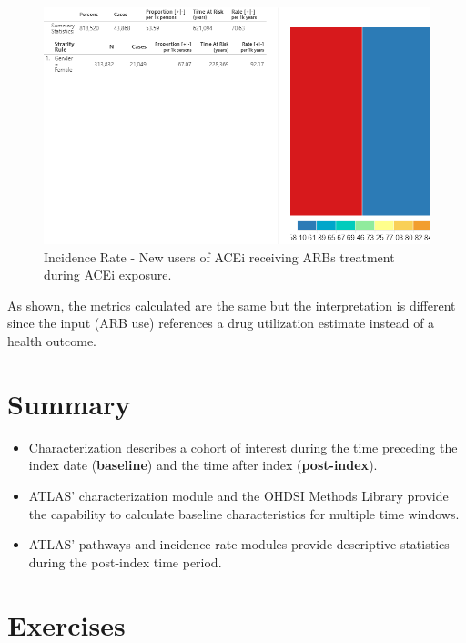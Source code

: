 \documentclass[11pt]{book}
\theoremstyle{definition}
\theoremstyle{definition}
\theoremstyle{definition}
\theoremstyle{remark}
\let\BeginKnitrBlock\begin \let\EndKnitrBlock\end
\begin{document}
\begin{figure}

{\centering \includegraphics[width=1\linewidth]{images/Characterization/atlasIncidenceResultsARB} 

}

\caption{Incidence Rate - New users of ACEi receiving ARBs treatment during ACEi exposure.}\label{fig:atlasIncidenceResultsARB}
\end{figure}

As shown, the metrics calculated are the same but the interpretation is different since the input (ARB use) references a drug utilization estimate instead of a health outcome.

\hypertarget{summary-8}{%
\section{Summary}\label{summary-8}}

\BeginKnitrBlock{rmdsummary}
\begin{itemize}
\item
  Characterization describes a cohort of interest during the time preceding the index date (\textbf{baseline}) and the time after index (\textbf{post-index}).
\item
  ATLAS' characterization module and the OHDSI Methods Library provide the capability to calculate baseline characteristics for multiple time windows.
\item
  ATLAS' pathways and incidence rate modules provide descriptive statistics during the post-index time period.
\end{itemize}
\EndKnitrBlock{rmdsummary}

\hypertarget{exercises-3}{%
\section{Exercises}\label{exercises-3}}
\end{document}
